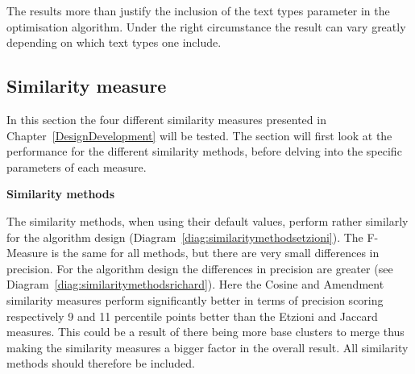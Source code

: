 The results more than justify the inclusion of the text types parameter in the optimisation algorithm. Under the right circumstance the result can vary greatly depending on which text types one include.

\subsection{Similarity measure}
In this section the four different similarity measures presented in Chapter~\ref{DesignDevelopment} will be tested. The section will first look at the performance for the different similarity methods, before delving into the specific parameters of each measure.

\textbf{Similarity methods}

The similarity methods, when using their default values, perform rather similarly for the \citeauthor{Oren1998} algorithm design (Diagram~\ref{diag:similaritymethodsetzioni}). The F-Measure is the same for all methods, but there are very small differences in precision. For the \citeauthor{Moe2014compact} algorithm design the differences in precision are greater (see Diagram~\ref{diag:similaritymethodsrichard}). Here the Cosine and Amendment similarity measures perform significantly better in terms of precision scoring respectively 9 and 11 percentile points better than the Etzioni and Jaccard measures. This could be a result of there being more base clusters to merge thus making the similarity measures a bigger factor in the overall result. All similarity methods should therefore be included.

